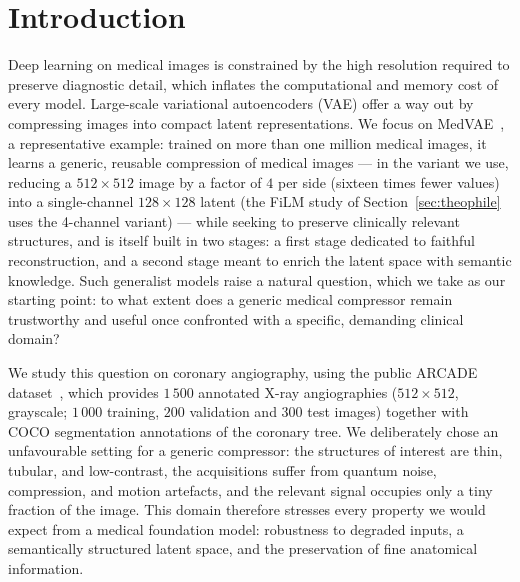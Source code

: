 \documentclass[conference]{IEEEtran}
\begin{document}
\section{Introduction}

Deep learning on medical images is constrained by the high resolution required to preserve diagnostic detail, which inflates the computational and memory cost of every model. Large-scale variational autoencoders (VAE) offer a way out by compressing images into compact latent representations. We focus on MedVAE~\cite{varma2025medvaeefficientautomatedinterpretation}, a representative example: trained on more than one million medical images, it learns a generic, reusable compression of medical images --- in the variant we use, reducing a $512\times512$ image by a factor of $4$ per side (sixteen times fewer values) into a single-channel $128\times128$ latent (the FiLM study of Section~\ref{sec:theophile} uses the 4-channel variant) --- while seeking to preserve clinically relevant structures, and is itself built in two stages: a first stage dedicated to faithful reconstruction, and a second stage meant to enrich the latent space with semantic knowledge. Such generalist models raise a natural question, which we take as our starting point: to what extent does a generic medical compressor remain trustworthy and useful once confronted with a specific, demanding clinical domain?

We study this question on coronary angiography, using the public ARCADE dataset~\cite{popov2024arcade}, which provides $1\,500$ annotated X-ray angiographies ($512\times512$, grayscale; $1\,000$ training, $200$ validation and $300$ test images) together with COCO segmentation annotations of the coronary tree. We deliberately chose an unfavourable setting for a generic compressor: the structures of interest are thin, tubular, and low-contrast, the acquisitions suffer from quantum noise, compression, and motion artefacts, and the relevant signal occupies only a tiny fraction of the image. This domain therefore stresses every property we would expect from a medical foundation model: robustness to degraded inputs, a semantically structured latent space, and the preservation of fine anatomical information.
\end{document}
